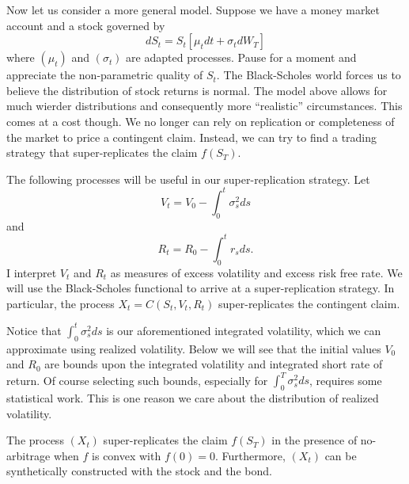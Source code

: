 \documentclass{report}
\begin{document}
Now let us consider a more general model.  Suppose we have a money
market account and a stock governed by
\[
dS_t = S_t [ \mu_t dt + \sigma_t dW_T ]
\]
where $(\mu_t)$ and $(\sigma_t)$ are adapted processes.  Pause for a
moment and appreciate the non-parametric quality of $S_t$.  The
Black-Scholes world forces us to believe the distribution of stock
returns is normal.  The model above allows for much wierder
distributions and consequently more ``realistic'' circumstances.  This
comes at a cost though.  We no longer can rely on replication or
completeness of the market to price a contingent claim.  Instead, we
can try to find a trading strategy that super-replicates the claim
$f(S_T)$.  

The following processes will be useful in our super-replication
strategy.  Let
\[
V_t = V_0 - \int_0^t \sigma_s^2 ds
\]
and
\[
R_t = R_0 - \int_0^t r_s ds.
\]  
I interpret $V_t$ and $R_t$ as measures of excess volatility and
excess risk free rate.  We will use the Black-Scholes functional to
arrive at a super-replication strategy.  In particular, the process
$X_t = C(S_t, V_t, R_t)$ super-replicates the contingent claim.

Notice that $\int_0^t \sigma_s^2 ds$ is our aforementioned integrated
volatility, which we can approximate using realized volatility.  Below
we will see that the initial values $V_0$ and $R_0$ are bounds upon
the integrated volatility and integrated short rate of return.  Of
course selecting such bounds, especially for $\int_0^T \sigma_s^2 ds$,
requires some statistical work.  This is one reason we care about the
distribution of realized volatility.

\begin{claim}
The process $(X_t)$ super-replicates the claim $f(S_T)$ in the
presence of no-arbitrage when $f$ is convex with $f(0) = 0$. 
Furthermore, $(X_t)$ can be synthetically constructed with the stock
and the bond.
\end{claim}
\end{document}
